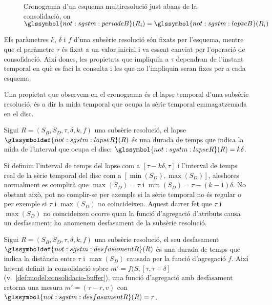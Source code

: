\begin{figure}[tp]
  \centering
  
  \caption{Cronograma d'un esquema multiresolució just abans de la consolidació,  on $\glssymbol{not:sgstm:periodeB}(R_i)=\glssymbol{not:sgstm:lapseB}(R_i)$}
  \label{fig:model:cronograma}
\end{figure}


Els paràmetres $k$, $\delta$ i $f$ d'una subsèrie resolució són fixats
per l'esquema, mentre que el paràmetre $\tau$ és fixat a un valor
inicial i va essent canviat per l'operació de consolidació. Així doncs,
les propietats que impliquin a $\tau$ dependran de l'instant temporal
en què es faci la consulta i les que no l'impliquin seran fixes per a
cada esquema.

Una propietat que observem en el cronograma és el lapse temporal d'una
subsèrie resolució, és a dir la mida temporal que ocupa
la sèrie temporal emmagatzemada en el disc.
\begin{definition} %
  Sigui $R=(S_B,S_D,\tau,\delta,k,f)$ una subsèrie resolució, el lapse
  $\glssymboldef{not:sgstm:lapseR}(R)$ és una durada de temps que
  indica la mida de l'interval que ocupa el disc:
  $\glssymbol{not:sgstm:lapseR}(R) = k\delta$.
\end{definition}


Si definim l'interval de temps del lapse com a $[\tau - k\delta,
\tau]$ i l'interval de temps real de la sèrie temporal del disc com a
$[\min(S_D),\max(S_D)]$, aleshores normalment es complirà que
$\max(S_D)=\tau$ i $\min(S_D)=\tau - (k-1)\delta$. No obstant això,
pot no complir-se per exemple si la sèrie temporal no és regular o per
exemple si $\tau$ i $\max(S_D)$ no coincideixen.  Aquest darrer fet
que $\tau$ i $\max(S_D)$ no coincideixen ocorre quan la funció
d'agregació d'atributs causa un desfasament; ho anomenem desfasament
de la subsèrie resolució.
\begin{definition} %
  \label{def:sgstm:desdsamentR}
  Sigui $R=(S_B,S_D,\tau,\delta,k,f)$ una subsèrie resolució, el seu
  desfasament $\glssymboldef{not:sgstm:desfasamentR}(R)$ és una durada
  de temps que indica la distància entre $\tau$ i $\max(S_D)$ causada
  per la funció d'agregació $f$. Així havent definit la consolidació
  sobre $m'=f(S,[\tau,\tau+\delta]$
  (v.~\autoref{def:model:consolidacio-buffer}), una funció d'agregació
  amb desfasament retorna una mesura $m'=(\tau - r,v)$ con
  $\glssymbol{not:sgstm:desfasamentR}(R) = r$.
\end{definition}



